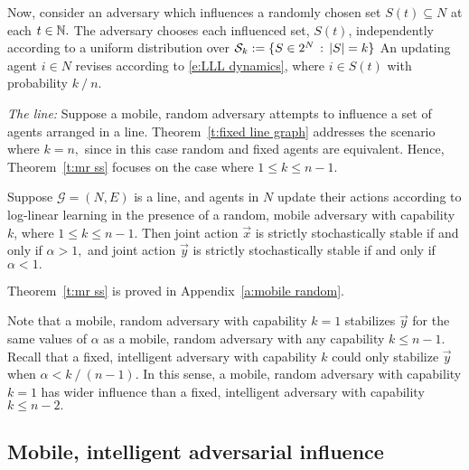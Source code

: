 Now, consider an adversary which influences a randomly chosen set $S(t)\subseteq N$ at each $t\in \mathbb{N}.$ The adversary chooses each influenced set, $S(t)$, independently according to a uniform distribution over 
$\mathcal{S}_k:=\{S\in 2^N\,:\, |S| = k\}$
An updating agent $i\in N$ revises according to \eqref{e:LLL dynamics}, where $i\in S(t)$ with probability $k\mathop{/}n$.%

\noindent\emph{The line:} 
Suppose a mobile, random adversary attempts to influence a set of agents arranged in a line. Theorem~\ref{t:fixed line graph} addresses the scenario where $k = n,$ since in this case random and fixed agents are equivalent. Hence, Theorem~\ref{t:mr ss} focuses on the case where $1\leq k\leq n-1.$

\begin{Theorem}\label{t:mr ss}
Suppose $\mathcal{G} = (N,E)$ is a line, and agents in $N$ update their actions according to log-linear learning in the presence of a random, mobile adversary with capability $k$, where $1\leq k\leq n-1$. Then joint action $\vec{x}$ is strictly stochastically stable if and only if $\alpha >1,$ and joint action $\vec{y}$ is strictly stochastically stable if and only if $\alpha<1.$ 
\end{Theorem}

Theorem~\ref{t:mr ss} is proved in Appendix~\ref{a:mobile random}.

Note that a mobile, random adversary with capability $k=1$ stabilizes $\vec{y}$ for the same values of $\alpha$ as a mobile, random adversary with any capability $k\leq n-1.$  Recall that a fixed, intelligent adversary with capability $k$ could only stabilize $\vec{y}$ when $\alpha < k\mathop{/} (n-1)$. In this sense, a mobile, random adversary with capability $k=1$ has wider influence than a fixed, intelligent adversary with capability $k\leq n-2.$ 


\subsection{Mobile, intelligent adversarial influence}

